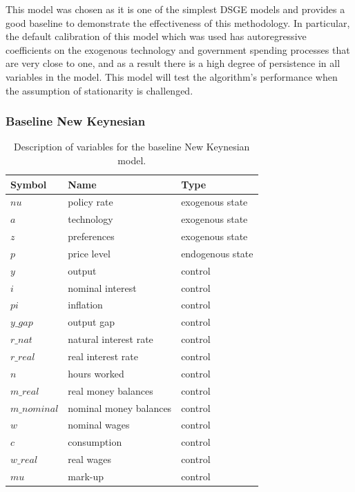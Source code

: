 \documentclass{article}
\begin{document}
This model was chosen as it is one of the simplest DSGE models and provides a good baseline to demonstrate the effectiveness of this methodology. In particular, the default calibration of this model which was used has autoregressive coefficients on the exogenous technology and government spending processes that are very close to one, and as a result there is a high degree of persistence in all variables in the model. This model will test the algorithm's performance when the assumption of stationarity is challenged.

\subsubsection{Baseline New Keynesian}

\begin{table}
  \centering
  \begin{tabular}{|l|l|l|}
    \hline
    Symbol & Name & Type \\
    \hline
    $nu$ & policy rate & exogenous state \\
    $a$ & technology & exogenous state \\
    $z$ & preferences & exogenous state \\
    $p$ & price level & endogenous state \\
    $y$ & output & control \\
    $i$ & nominal interest & control \\
    $pi$ & inflation & control \\
    $y\_gap$ & output gap & control \\
    $r\_nat$ & natural interest rate & control \\
    $r\_real$ & real interest rate & control \\
    $n$ & hours worked & control \\
    $m\_real$ & real money balances & control \\
    $m\_nominal$ & nominal money balances & control \\
    $w$ & nominal wages & control \\ 
    $c$ & consumption & control \\
    $w\_real$ & real wages & control \\
    $mu$ & mark-up & control \\ \cline{2-2}
    \hline
  \end{tabular}
  \caption{Description of variables for the baseline New Keynesian model.}
  \label{nk_data}
\end{table}
\end{document}
